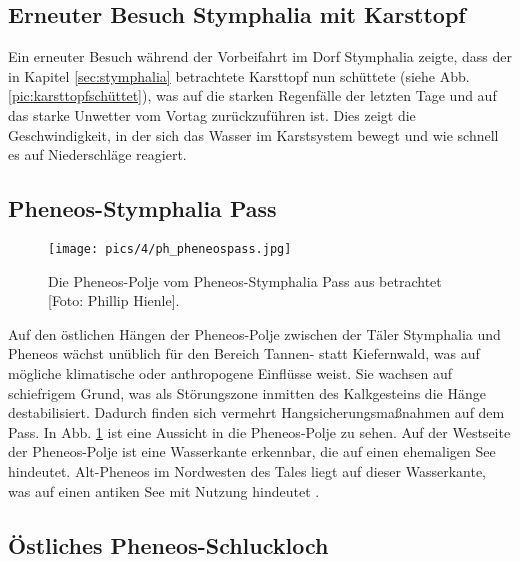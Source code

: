 \documentclass[preprint]{geomorphica} %
\begin{document}
\subsection{Erneuter Besuch Stymphalia mit Karsttopf}

Ein erneuter Besuch während der Vorbeifahrt im Dorf Stymphalia zeigte, dass der in Kapitel \ref{sec:stymphalia} betrachtete Karsttopf nun schüttete (siehe Abb. \ref{pic:karsttopfschüttet}), was auf die starken Regenfälle der letzten Tage und auf das starke Unwetter vom Vortag zurückzuführen ist. Dies zeigt die Geschwindigkeit, in der sich das Wasser im Karstsystem bewegt und wie schnell es auf Niederschläge reagiert.

\subsection{Pheneos-Stymphalia Pass}

\begin{figure}[h]
    \centering
    \texttt{[image: pics/4/ph\_pheneospass.jpg]}
    \caption{Die Pheneos-Polje vom Pheneos-Stymphalia Pass aus betrachtet [Foto: Phillip Hienle].}
    \label{pic:pheneospass}
\end{figure}

Auf den östlichen Hängen der Pheneos-Polje zwischen der Täler Stymphalia und Pheneos wächst unüblich für den Bereich Tannen- statt Kiefernwald, was auf mögliche klimatische oder anthropogene Einflüsse weist. Sie wachsen auf schiefrigem Grund, was als Störungszone inmitten des Kalkgesteins die Hänge destabilisiert. Dadurch finden sich vermehrt Hangsicherungsmaßnahmen auf dem Pass. In Abb. \ref{pic:pheneospass} ist eine Aussicht in die Pheneos-Polje zu sehen. Auf der Westseite der Pheneos-Polje ist eine Wasserkante erkennbar, die auf einen ehemaligen See hindeutet. Alt-Pheneos im Nordwesten des Tales liegt auf dieser Wasserkante, was auf einen antiken See mit Nutzung hindeutet \cite{seguinReconstructionPalaeoenvironmentalVariability2020}.

\subsection{Östliches Pheneos-Schluckloch}
\end{document}
